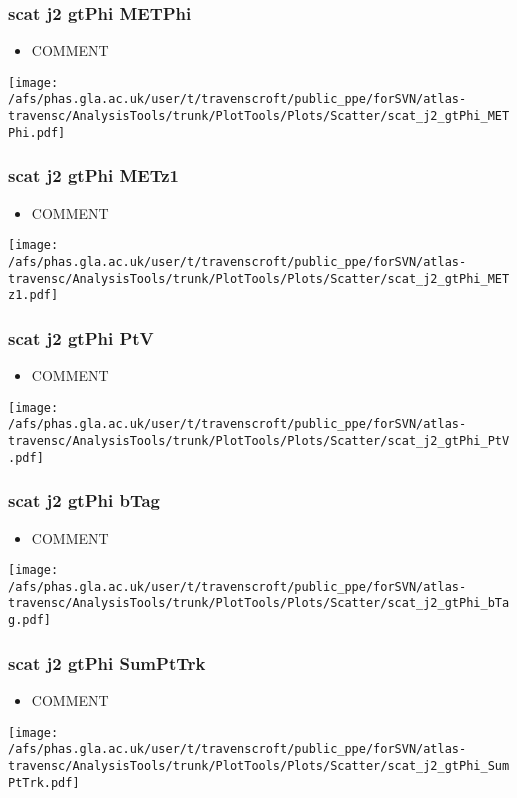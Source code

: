 \documentclass{beamer}
\begin{document}
\begin{frame}
\frametitle{scat j2 gtPhi METPhi}
\begin{itemize}
\item COMMENT
\end{itemize}
\begin{center}
\texttt{[image: /afs/phas.gla.ac.uk/user/t/travenscroft/public\_ppe/forSVN/atlas-travensc/AnalysisTools/trunk/PlotTools/Plots/Scatter/scat\_j2\_gtPhi\_METPhi.pdf]}
\end{center}
\end{frame}

\begin{frame}
\frametitle{scat j2 gtPhi METz1}
\begin{itemize}
\item COMMENT
\end{itemize}
\begin{center}
\texttt{[image: /afs/phas.gla.ac.uk/user/t/travenscroft/public\_ppe/forSVN/atlas-travensc/AnalysisTools/trunk/PlotTools/Plots/Scatter/scat\_j2\_gtPhi\_METz1.pdf]}
\end{center}
\end{frame}

\begin{frame}
\frametitle{scat j2 gtPhi PtV}
\begin{itemize}
\item COMMENT
\end{itemize}
\begin{center}
\texttt{[image: /afs/phas.gla.ac.uk/user/t/travenscroft/public\_ppe/forSVN/atlas-travensc/AnalysisTools/trunk/PlotTools/Plots/Scatter/scat\_j2\_gtPhi\_PtV.pdf]}
\end{center}
\end{frame}

\begin{frame}
\frametitle{scat j2 gtPhi bTag}
\begin{itemize}
\item COMMENT
\end{itemize}
\begin{center}
\texttt{[image: /afs/phas.gla.ac.uk/user/t/travenscroft/public\_ppe/forSVN/atlas-travensc/AnalysisTools/trunk/PlotTools/Plots/Scatter/scat\_j2\_gtPhi\_bTag.pdf]}
\end{center}
\end{frame}

\begin{frame}
\frametitle{scat j2 gtPhi SumPtTrk}
\begin{itemize}
\item COMMENT
\end{itemize}
\begin{center}
\texttt{[image: /afs/phas.gla.ac.uk/user/t/travenscroft/public\_ppe/forSVN/atlas-travensc/AnalysisTools/trunk/PlotTools/Plots/Scatter/scat\_j2\_gtPhi\_SumPtTrk.pdf]}
\end{center}
\end{frame}
\end{document}
